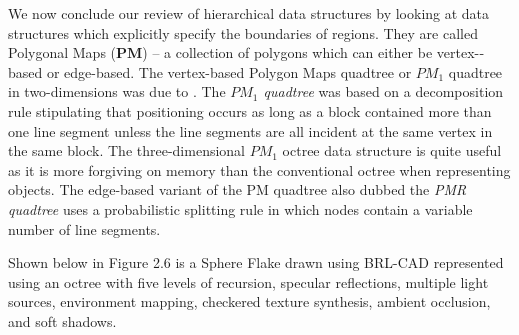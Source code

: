 \hspace{30} We   now   conclude   our   review   of   hierarchical   data   structures   by   looking   at  
data   structures   which   explicitly   specify   the   boundaries   of   regions.   They   are  
called   Polygonal   Maps   ($\mathbf{PM}$) – a   collection   of   polygons   which   can   either   be  
vertex-­based   or   edge-­based.   The   vertex-­based   Polygon   Maps   quadtree   or   $PM_1$
 quadtree   in   two­-dimensions   was   due   to   \cite{30}.   The   \textit{$PM_1$   quadtree}   was   based   on   a  
decomposition   rule   stipulating   that   positioning   occurs   as   long   as   a   block  
contained   more   than   one   line   segment   unless   the   line   segments   are   all   incident  
at   the   same   vertex   in   the   same   block.   The   three-­dimensional   $PM_1$   octree   data  
structure   is   quite   useful   as   it   is   more   forgiving   on   memory   than   the   conventional  
octree   when   representing   objects.   The   edge­-based   variant   of   the   PM   quadtree also dubbed the \textit{PMR quadtree}   uses   a   probabilistic   splitting   rule   in   which   nodes   contain   a  
variable number of line segments.

\hspace{30} Shown   below   in Figure 2.6 is   a   Sphere   Flake   drawn   using   BRL-­CAD   represented  
using   an   octree   with   five   levels   of   recursion,   specular   reflections,   multiple   light  
sources,   environment   mapping,   checkered   texture   synthesis,   ambient  
occlusion, and soft shadows.

